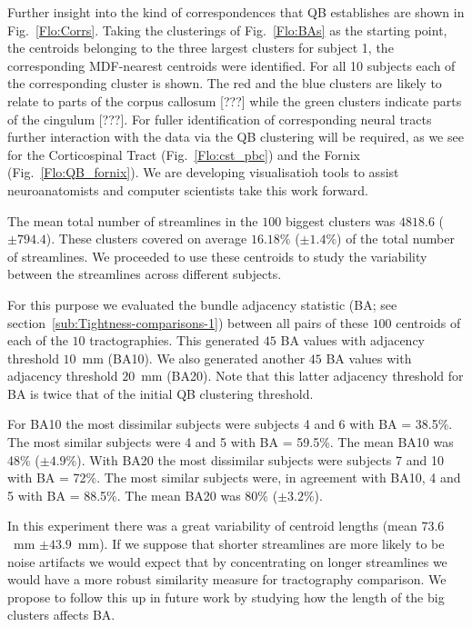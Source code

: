 \documentclass{bioinfo}
\begin{document}
Further insight into the kind of correspondences that QB establishes are
shown in Fig.~\ref{Flo:Corrs}. Taking the clusterings of
Fig.~\ref{Flo:BAs} as the starting point, the centroids belonging to the
three largest clusters for subject 1, the corresponding MDF-nearest
centroids were identified. For all 10 subjects each of the corresponding
cluster is shown. The red and the blue clusters are likely to relate to
parts of the corpus callosum [???]  while the green clusters indicate
parts of the cingulum [???]. For fuller identification of corresponding
neural tracts further interaction with the data via the QB clustering
will be required, as we see for the Corticospinal Tract
(Fig.~\ref{Flo:cst_pbc}) and the Fornix (Fig.~\ref{Flo:QB_fornix}). We
are developing visualisatioh tools to assist neuroanatomists and
computer scientists take this work forward.

The mean total number of streamlines in the $100$ biggest clusters was
$\num{4818.6}$ ($\pm \num{794.4}$). These clusters covered on average
$16.18\%$ ($\pm\num{1.4}\%$) of the total number of streamlines. We
proceeded to use these centroids to study the variability between the
streamlines across different subjects.

For this purpose we evaluated the bundle adjacency statistic (BA; see
section~\ref{sub:Tightness-comparisons-1}) between all pairs of these
$100$ centroids of each of the $10$ tractographies. This generated $45$
BA values with adjacency threshold $10$~mm (BA10). We also generated
another $45$ BA values with adjacency threshold $20$~mm (BA20). Note
that this latter adjacency threshold for BA is twice that of the initial
QB clustering threshold.

For BA10 the most dissimilar subjects were subjects 4 and 6 with BA =
38.5\%. The most similar subjects were 4 and 5 with BA = 59.5\%. The
mean BA10 was 48\% ($\pm\num{4.9}$\%). With BA20 the most dissimilar
subjects were subjects 7 and 10 with BA = 72\%. The most similar
subjects were, in agreement with BA10, 4 and 5 with BA = 88.5\%. The
mean BA20 was 80\% ($\pm\num{3.2}$\%).

In this experiment there was a great variability of centroid lengths
(mean $73.6$~mm $\pm\num{43.9}$~mm). If we suppose that shorter
streamlines are more likely to be noise artifacts we would expect that
by concentrating on longer streamlines we would have a more robust
similarity measure for tractography comparison. We propose to follow
this up in future work by studying how the length of the big clusters
affects BA.
\end{document}
